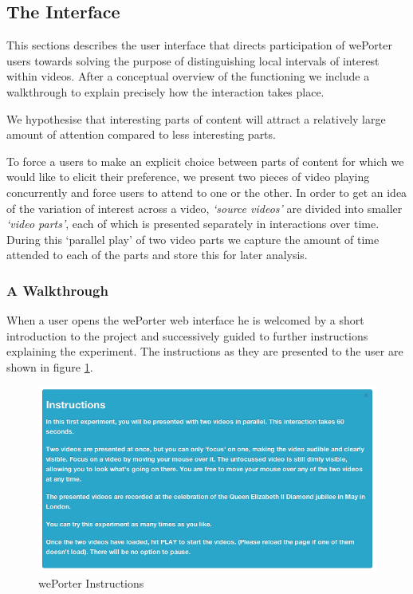 \subsection{The Interface}
\label{sec:weporter_interface} 
This sections describes the user interface that directs participation of wePorter users towards solving the purpose of distinguishing local intervals of interest within videos. After a conceptual overview of the functioning we include a walkthrough to explain precisely how the interaction takes place.

We hypothesise that interesting parts of content will attract a relatively large amount of attention compared to less interesting parts. 

To force a users to make an explicit choice between parts of content for which we would like to elicit their preference, we present two pieces of video playing concurrently and force users to attend to one or the other. In order to get an idea of the variation of interest across a video, \emph{`source videos'} are divided into smaller \emph{`video parts'}, each of which is presented separately in interactions over time. During this `parallel play' of two video parts we capture the amount of time attended to each of the parts and store this for later analysis. 

\subsubsection{A Walkthrough}
When a user opens the wePorter web interface he is welcomed by a short introduction to the project and successively guided to further instructions explaining the experiment. The instructions as they are presented to the user are shown in figure \ref{fig:instructions}.

\begin{figure}[htbp]
  \centering
    \includegraphics[width=\textwidth]{img/instructions}
  \caption{wePorter Instructions}
  \label{fig:instructions}
\end{figure}

